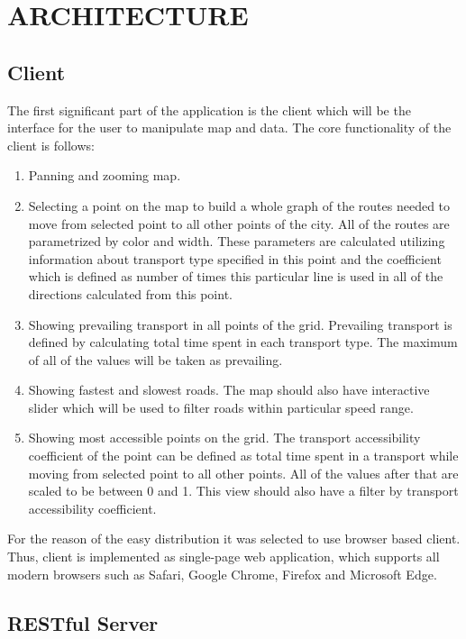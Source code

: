
\section{ARCHITECTURE}
\subsection{Client}

The first significant part of the application is the client which will
be the interface for the user to manipulate map and data. The core functionality of the client
is follows:

\begin{enumerate}
  \item Panning and zooming map.
  \item Selecting a point on the map to build a whole graph of
  the routes needed to move from selected point to all other points of the city. All of the routes
  are parametrized by color and width. These parameters are calculated utilizing information
  about transport type specified in this point and the coefficient which is defined as number of
  times this particular line is used in all of the directions calculated from this point.
  \item Showing prevailing transport in all points of the grid. Prevailing transport is defined
  by calculating total time spent in each transport type. The maximum of all of the values will
  be taken as prevailing.
  \item Showing fastest and slowest roads. The map should also have interactive slider
  which will be used to filter roads within particular speed range.
  \item Showing most accessible points on the grid. The transport accessibility coefficient of the
  point can be defined as total time spent in a transport while moving from selected point to all
  other points. All of the values after that are scaled to be between 0 and 1. This view should also
  have a filter by transport accessibility coefficient.
\end{enumerate}

For the reason of the easy distribution it was selected to use browser based client. Thus,
client is implemented as single-page web application, which supports all modern browsers such
as Safari, Google Chrome, Firefox and Microsoft Edge.

\subsection{RESTful Server}

